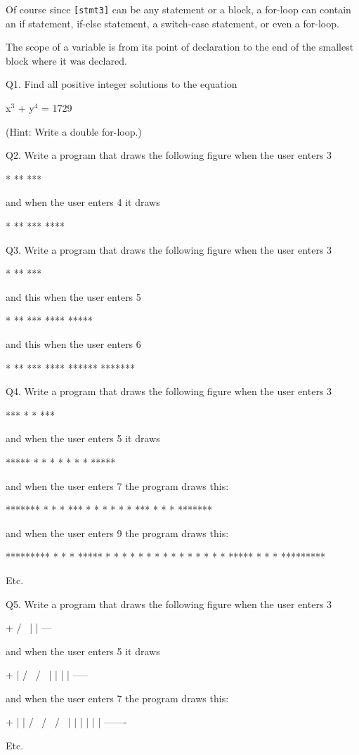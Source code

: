 \begin{console}
\begin{console}
Of course since \texttt{[stmt3]} can be any statement or a block, a
for-loop can contain an if statement, if-else statement, a switch-case
statement, or even a for-loop.

The scope of a variable is from its point of declaration to the end of
the smallest block where it was declared.

\newpage{}

Q1. Find all positive integer solutions to the equation
\begin{center}
x$^{3}$ + y$^{4}$ = 1729
\end{center}
(Hint: Write a double for-loop.)

Q2. Write a program that draws the following figure when the user enters 3
\begin{console}
  *
 **
***
\end{console}
and when the user enters 4 it draws
\begin{console}
   *
  **
 ***
****
\end{console}
Q3. Write a program that draws the following figure when the user enters
3
\begin{console}
*
 **
***
\end{console}
and this when the user enters 5
\begin{console}
*
  **
***
 ****
*****
\end{console}
and this when the user enters 6
\begin{console}
*
     **
***
   ****
******
*******
\end{console}
Q4. Write a program that draws the following figure when the user enters
3
\begin{console}
***
* *
***
\end{console}
and when the user enters 5 it draws
\begin{console}
*****
*   *
* * *
*   *
*****
\end{console}
and when the user enters 7 the program draws this:
\begin{console}
*******
*     *
* *** *
* * * *
* *** *
*     *
*******
\end{console}
and when the user enters 9 the program draws this:
\begin{console}
*********
*       *
* ***** *
* *   * *
* * * * *
* *   * *
* ***** *
*       *
*********
\end{console}
Etc.

Q5. Write a program that draws the following figure when the user enters
3
\begin{console}
 +
/ \
| |
---
\end{console}
and when the user enters 5 it draws
\begin{console}
  +
 |
 / \
/   \
|   |
|   |
-----
\end{console}
and when the user enters 7 the program draws this:
\begin{console}
   +
   |
   |
  / \
 /   \
/     \          
|     |
|     |
|     |           
-------
\end{console}
Etc.


\end{console}
\end{console}
